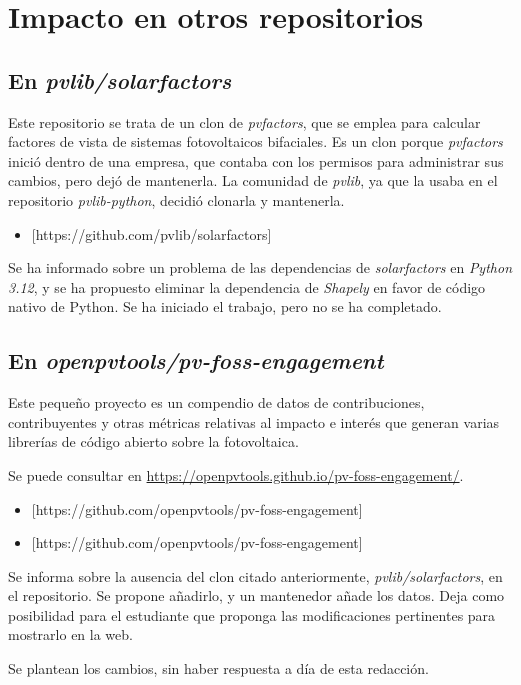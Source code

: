 
\section{Impacto en otros repositorios}

\subsection{En \textit{pvlib/solarfactors}}

Este repositorio se trata de un clon de \textit{pvfactors}, que se emplea para calcular factores de vista de sistemas fotovoltaicos bifaciales. Es un clon porque \textit{pvfactors} inició dentro de una empresa, que contaba con los permisos para administrar sus cambios, pero dejó de mantenerla. La comunidad de \textit{pvlib}, ya que la usaba en el repositorio \textit{pvlib-python}, decidió clonarla y mantenerla.

\begin{itemize}
    \item {}[https://github.com/pvlib/solarfactors]
\end{itemize}

Se ha informado sobre un problema de las dependencias de \textit{solarfactors} en \textit{Python 3.12}, y se ha propuesto eliminar la dependencia de \textit{Shapely} en favor de código nativo de Python. Se ha iniciado el trabajo, pero no se ha completado.

\subsection{En \textit{openpvtools/pv-foss-engagement}}

Este pequeño proyecto es un compendio de datos de contribuciones, contribuyentes y otras métricas relativas al impacto e interés que generan varias librerías de código abierto sobre la fotovoltaica.

Se puede consultar en \url{https://openpvtools.github.io/pv-foss-engagement/}.

\begin{itemize}
    \item {}[https://github.com/openpvtools/pv-foss-engagement]
    \item {}[https://github.com/openpvtools/pv-foss-engagement]
\end{itemize}

Se informa sobre la ausencia del clon citado anteriormente, \textit{pvlib/solarfactors}, en el repositorio. Se propone añadirlo, y un mantenedor añade los datos. Deja como posibilidad para el estudiante que proponga las modificaciones pertinentes para mostrarlo en la web.

Se plantean los cambios, sin haber respuesta a día de esta redacción.
